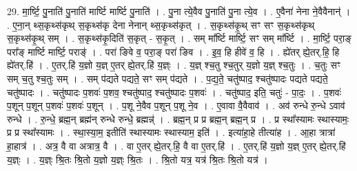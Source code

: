 \documentclass[17pt]{extarticle}
\begin{document}
29. मा॒र्ष्टि॒ पु॒नाति॑ पु॒नाति॑ मार्ष्टि मार्ष्टि पु॒नाति॑ । . पु॒ना त्ये॒वैव पु॒नाति॑ पु॒ना त्ये॒व । . ए॒वैना॑ नेना ने॒वैवैनान्॑ । . ए॒ना॒न् थ्स॒कृथ्स॑कृथ् स॒कृथ्स॑कृ देना नेनान् थ्स॒कृथ्स॑कृत् । . स॒कृथ्स॑कृ॒थ् सꣳ सꣳ स॒कृथ्स॑कृथ् स॒कृथ्स॑कृ॒थ् सम् । . स॒कृथ्स॑कृ॒दिति॑ स॒कृत् - स॒कृ॒त् । . सम् मा᳚र्ष्टि मार्ष्टि॒ सꣳ सम् मा᳚र्ष्टि । . मा॒र्ष्टि॒ परा॒ङ् परा᳚ङ् मार्ष्टि मार्ष्टि॒ पराङ्॑ । . परा॑ ङिवे व॒ परा॒ङ् परा॑ ङिव । . इ॒व॒ हि हीवे॑ व॒ हि । . ह्ये॑तर् ह्ये॒तर्.हि॒ हि ह्ये॑तर्.हि॑ । . ए॒तर्.हि॑ य॒ज्ञो य॒ज्ञ् ए॒तर् ह्ये॒तर्.हि॑ य॒ज्ञ्ः । . य॒ज्ञ् श्च॒तु श्च॒तुर् य॒ज्ञो य॒ज्ञ् श्च॒तुः । . च॒तुः सꣳ सम् च॒तु श्च॒तुः सम् । . सम् प॑द्यते पद्यते॒ सꣳ सम् प॑द्यते । . प॒द्य॒ते॒ चतु॑ष्पाद॒ श्चतु॑ष्पादः पद्यते पद्यते॒ चतु॑ष्पादः । . चतु॑ष्पादः प॒शवः॑ प॒शव॒ श्चतु॑ष्पाद॒ श्चतु॑ष्पादः प॒शवः॑ । . चतु॑ष्पाद॒ इति॒ चतुः॑ - पा॒दः॒ । . प॒शवः॑ प॒शून् प॒शून् प॒शवः॑ प॒शवः॑ प॒शून् । . प॒शू ने॒वैव प॒शून् प॒शू ने॒व । . ए॒वावा वै॒वैवाव॑ । . अव॑ रुन्धे रु॒न्धे ऽवाव॑ रुन्धे । . रु॒न्धे॒ ब्रह्म॒न् ब्रह्म॑न् रुन्धे रुन्धे॒ ब्रह्मन्न्॑ । . ब्रह्म॒न् प्र प्र ब्रह्म॒न् ब्रह्म॒न् प्र । . प्र स्था᳚स्यामः स्थास्यामः॒ प्र प्र स्था᳚स्यामः । . स्था॒स्या॒म॒ इतीति॑ स्थास्यामः स्थास्याम॒ इति॑ । . इत्या॑हा॒हे तीत्या॑ह । . आ॒हा त्रात्रा॑ हा॒हात्र॑ । . अत्र॒ वै वा अत्रात्र॒ वै । . वा ए॒तर् ह्ये॒तर्.हि॒ वै वा ए॒तर्.हि॑ । . ए॒तर्.हि॑ य॒ज्ञो य॒ज्ञ् ए॒तर् ह्ये॒तर्.हि॑ य॒ज्ञ्ः । . य॒ज्ञ्ः श्रि॒तः श्रि॒तो य॒ज्ञो य॒ज्ञ्ः श्रि॒तः । . श्रि॒तो यत्र॒ यत्र॑ श्रि॒तः श्रि॒तो यत्र॑ । \newline
\end{document}
